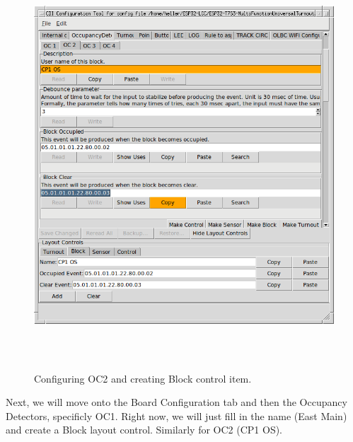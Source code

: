 \documentclass[12pt,twoside]{article}
\begin{document}
\begin{figure}[hbpt]\begin{centering}%
\includegraphics[height=6in]{ExampleSidingCP1-ConfigOC2.png}
\caption{Configuring OC2 and creating Block control item.}
\label{fig:ExampleSidingCP1-ConfigOC2}
\end{centering}\end{figure}

Next, we will move onto the Board Configuration tab and then the Occupancy
Detectors, specificly OC1. Right now, we will just fill in the name (East
Main) and create a Block layout control. Similarly for OC2 (CP1 OS).
\end{document}
